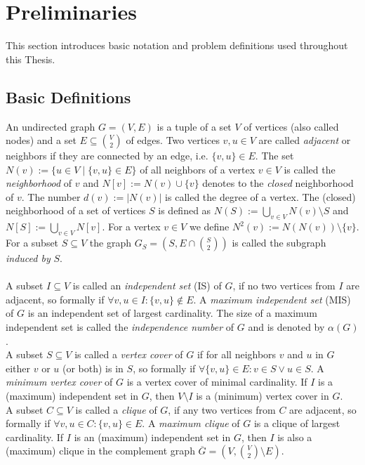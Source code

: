 \documentclass[]{article}
\begin{document}
\section{Preliminaries} \label{sec2}

This section introduces basic notation and problem definitions used throughout this Thesis.

\subsection{Basic Definitions}

An undirected graph $G=(V,E)$ is a tuple of a set $V$ of vertices (also called nodes) and a set $E\subseteq \binom{V}{2}$ of edges. Two vertices $v,u\in V$ are called \textit{adjacent} or neighbors if they are connected by an edge, i.e. $\{v,u\}\in E$. The set $N(v) := \{u \in V\;|\; \{v,u\}\in E \}$ of all neighbors of a vertex $v\in V$ is called the \textit{neighborhood} of $v$ and $N[v] := N(v) \cup \{v\}$ denotes to the \textit{closed} neighborhood of $v$. The number $d(v):=|N(v)|$ is called the degree of a vertex. The (closed) neighborhood of a set of vertices $S$ is defined as $N(S) := \bigcup_{v\in V}N(v)\setminus S$ and $N[S] := \bigcup_{v\in V}N[v]$. For a vertex $v\in V$ we define $N^2(v) := N(N(v))\setminus\{v\}$. For a subset $S\subseteq V$ the graph $G_S=(S, E\cap\binom{S}{2})$ is called the subgraph \textit{induced by} $S$.\paragraph{}
A subset $I\subseteq V$ is called an \emph{independent set} (IS) of $G$, if no two vertices from $I$ are adjacent, so formally if $\forall v,u\in I: \{v,u\}\notin E$. A \emph{maximum independent set} (MIS) of $G$ is an independent set of largest cardinality. The size of a maximum independent set is called the \emph{independence number} of $G$ and is denoted by $\alpha(G)$. \\
A subset $S\subseteq V$ is called a \emph{vertex cover} of $G$ if for all neighbors $v$ and $u$ in $G$ either $v$ or $u$ (or both) is in $S$, so formally if $\forall \{v,u\}\in E: v\in S \vee u\in S$. A \emph{minimum vertex cover} of $G$ is a vertex cover of minimal cardinality. If $I$ is a (maximum) independent set in $G$, then $V\setminus I$ is a (minimum) vertex cover in $G$.\\
A subset $C\subseteq V$ is called a \emph{clique} of $G$, if any two vertices from $C$ are adjacent, so formally if $\forall v,u\in C:\{v,u\}\in E$. A \emph{maximum clique} of $G$ is a clique of largest cardinality. If $I$ is an (maximum) independent set in $G$, then $I$ is also a (maximum) clique in the complement graph $\overline{G}=(V, \binom{V}{2}\setminus E)$.\paragraph{}
\end{document}
